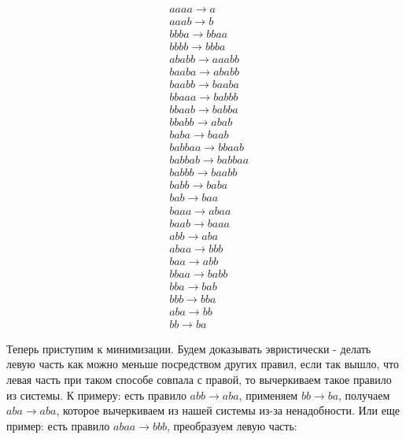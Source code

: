\documentclass{article}
\begin{document}
\begin{align*}
&aaaa \rightarrow a \\
&aaab \rightarrow b \\
&bbba \rightarrow bbaa \\
&bbbb \rightarrow bbba \\
&ababb \rightarrow aaabb \\
&baaba \rightarrow ababb \\
&baabb \rightarrow baaba \\
&bbaaa \rightarrow babbb \\
&bbaab \rightarrow babba \\
&bbabb \rightarrow abab \\
&baba \rightarrow baab \\
&babbaa \rightarrow bbaab \\
&babbab \rightarrow babbaa \\
&babbb \rightarrow baabb \\
&babb \rightarrow baba \\
&bab \rightarrow baa \\
&baaa \rightarrow abaa \\
&baab \rightarrow baaa \\
&abb \rightarrow aba \\
&abaa \rightarrow bbb \\
&baa \rightarrow abb \\
&bbaa \rightarrow babb \\
&bba \rightarrow bab \\
&bbb \rightarrow bba \\
&aba \rightarrow bb \\
&bb \rightarrow ba
\end{align*}

Теперь приступим к минимизации. Будем доказывать эвристически - делать левую часть как можно меньше посредством других правил, если так вышло, что левая часть при таком способе совпала с правой, то вычеркиваем такое правило из системы. К примеру: есть правило $abb\rightarrow aba$, применяем $bb\rightarrow ba$, получаем $aba\rightarrow aba$, которое вычеркиваем из нашей системы из-за ненадобности. Или еще пример: есть правило $abaa\rightarrow bbb$, преобразуем левую часть:

\begin{center}
\end{center}
\end{document}
